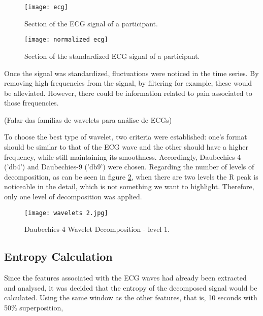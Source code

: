 \begin{figure}[htbp]
    \centering
    \begin{minipage}{0.45\textwidth}
        \centering
        \texttt{[image: ecg]}
        \caption{Section of the ECG signal of a participant.}
        \label{fig:ecg}
    \end{minipage}
    \hfill
    \begin{minipage}{0.45\textwidth}
        \centering
        \texttt{[image: normalized ecg]}
        \caption{Section of the standardized ECG signal of a participant.}
        \label{fig:normalized_ecg}
    \end{minipage}
\end{figure}

Once the signal was standardized, fluctuations were noticed in the time series.
By removing high frequencies from the signal, by filtering for example, these would be alleviated.
However, there could be information related to pain associated to those frequencies.

(Falar das famílias de wavelets para análise de ECGs)

To choose the best type of wavelet, two criteria were established: one's format should be similar to that of the ECG wave and the other should have a higher frequency, while still maintaining its smoothness.
Accordingly, Daubechies-4 ('db4') and Daubechies-9 ('db9') were chosen.
Regarding the number of levels of decomposition, as can be seen in figure \ref{fig:wavelets2}, when there are two levels the R peak is noticeable in the detail, which is not something we want to highlight.
Therefore, only one level of decomposition was applied.

\begin{figure}[h!]
    \centering
    \texttt{[image: wavelets 2.jpg]}
    \caption{Daubechies-4 Wavelet Decomposition - level 1.}
    \label{fig:wavelets2}
\end{figure}


\subsection{Entropy Calculation}
Since the features associated with the ECG waves had already been extracted and analysed, it was decided that the entropy of the decomposed signal would be calculated.
Using the same window as the other features, that is, 10 seconds with 50\% superposition, 



